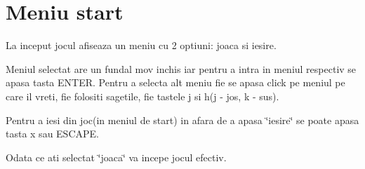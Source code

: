 \hypertarget{group__group__meniu__start}{}\section{Meniu start}
\label{group__group__meniu__start}
La inceput jocul afiseaza un meniu cu 2 optiuni\+: joaca si iesire.

Meniul selectat are un fundal mov inchis iar pentru a intra in meniul respectiv se apasa tasta E\+N\+T\+ER. Pentru a selecta alt meniu fie se apasa click pe meniul pe care il vreti, fie folositi sagetile, fie tastele j si h(j -\/ jos, k -\/ sus).

Pentru a iesi din joc(in meniul de start) in afara de a apasa \char`\"{}iesire\char`\"{} se poate apasa tasta \textquotesingle{}x\textquotesingle{} sau E\+S\+C\+A\+PE.

Odata ce ati selectat \char`\"{}joaca\char`\"{} va incepe jocul efectiv. 